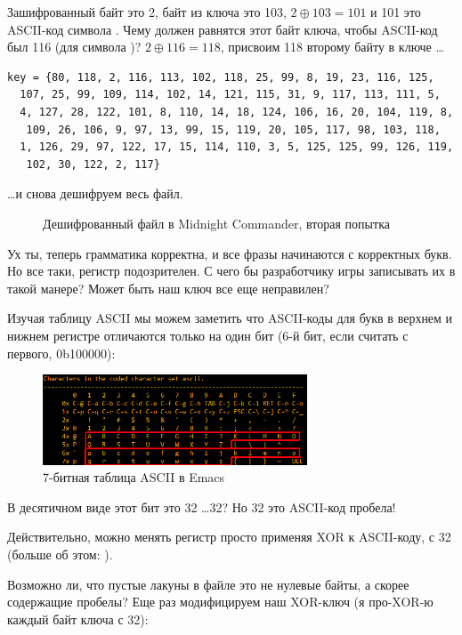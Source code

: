 Зашифрованный байт это 2, байт из ключа это 103, $2 \oplus 103=101$ и 101 это ASCII-код символа .
Чему должен равнятся этот байт ключа, чтобы ASCII-код был 116 (для символа  )?
$2 \oplus 116=118$, присвоим 118 второму байту в ключе \dots

\begin{lstlisting}[style=custommath]
key = {80, 118, 2, 116, 113, 102, 118, 25, 99, 8, 19, 23, 116, 125, 
  107, 25, 99, 109, 114, 102, 14, 121, 115, 31, 9, 117, 113, 111, 5, 
  4, 127, 28, 122, 101, 8, 110, 14, 18, 124, 106, 16, 20, 104, 119, 8,
   109, 26, 106, 9, 97, 13, 99, 15, 119, 20, 105, 117, 98, 103, 118, 
  1, 126, 29, 97, 122, 17, 15, 114, 110, 3, 5, 125, 125, 99, 126, 119,
   102, 30, 122, 2, 117}
\end{lstlisting}

\dots и снова дешифруем весь файл.

\begin{figure}[H]
\centering
{}
\caption{Дешифрованный файл в Midnight Commander, вторая попытка}
\end{figure}

Ух ты, теперь грамматика корректна, и все фразы начинаются с корректных букв.
Но все таки, регистр подозрителен.
С чего бы разработчику игры записывать их в такой манере?
Может быть наш ключ все еще неправилен?

Изучая таблицу ASCII мы можем заметить что ASCII-коды для букв в верхнем и нижнем регистре отличаются только на один бит
(6-й бит, если считать с первого, 0b100000):

\begin{figure}[H]
\centering
\includegraphics[width=0.7\textwidth]{ascii.png}
\caption{7-битная таблица \ac{ASCII} в Emacs}
\end{figure}

В десятичном виде этот бит это 32 \dots 32?
Но 32 это ASCII-код пробела!

Действительно, можно менять регистр просто применяя XOR к ASCII-коду, с 32 (больше об этом: ).

Возможно ли, что пустые лакуны в файле это не нулевые байты, а скорее содержащие пробелы?
Еще раз модифицируем наш XOR-ключ (я про-XOR-ю каждый байт ключа с 32):

